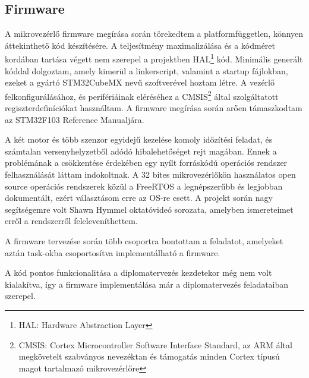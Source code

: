\subsection{Firmware}

A mikrovezérlő firmware megírása során törekedtem a platformfüggetlen, könnyen áttekinthető kód készítésére. A teljesítmény maximalizálása és a kódméret kordában tartása végett nem szerepel a projektben
HAL\footnote{HAL: Hardware Abstraction Layer} kód. Minimális generált kóddal dolgoztam, amely kimerül a linkerscript, valamint a startup fájlokban, ezeket a gyártó STM32CubeMX nevű szoftverével hoztam létre. A vezérlő
felkonfigurálásához, és perifériáinak eléréséhez a CMSIS\footnote{CMSIS: Cortex Microcontroller Software Interface Standard, az ARM által megkövetelt szabványos nevezéktan és támogatás minden Cortex típusú magot tartalmazó
mikrovezérlőre} által szolgáltatott regiszterdefiníciókat használtam. A firmware megírása során arően támaszkodtam az STM32F103 Reference Manualjára.

A két motor és több szenzor egyidejű kezelése komoly időzítési feladat, és számtalan versenyhelyzetből adódó hibalehetőséget rejt magában. Ennek a problémának a csökkentése érdekében egy nyílt forráskódú operációs rendszer
felhasználását láttam indokoltnak. A 32 bites mikrovezérlőkön használatos open source operációs rendszerek közül a FreeRTOS a legnépszerűbb és legjobban dokumentált, ezért választásom erre az
OS-re esett. A projekt során nagy segítségemre volt Shawn Hymmel oktatóvideó sorozata, amelyben ismereteimet erről a rendszerről feleleveníthettem. 

A firmware tervezése során több csoportra bontottam a feladatot, amelyeket aztán task-okba csoportosítva implementálható a firmware.


A kód pontos funkcionalitása a diplomatervezés kezdetekor még nem volt kialakítva, így a firmware implementálása már a diplomatervezés feladataiban szerepel.

